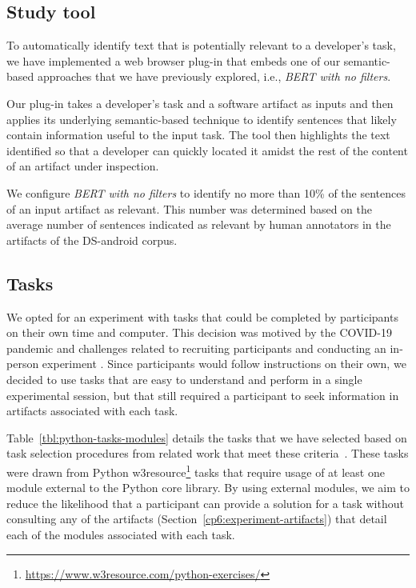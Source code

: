\subsection{Study tool}



To automatically identify text that is potentially relevant to a developer's task, we have implemented 
a web browser plug-in that embeds one of our semantic-based approaches that we have previously explored, i.e., \textit{BERT with no filters}.

 


Our plug-in takes a developer's task and a software artifact as inputs and then applies its underlying semantic-based technique  to identify sentences that likely contain information useful to the input task.
The tool then highlights the text identified so that a developer can quickly located it amidst the rest of the content of an artifact  under inspection. 


We configure \textit{BERT with no filters} to identify no more than 10\% of the sentences of an input artifact as relevant.
This number was determined based on the average number of sentences indicated as relevant by human annotators in the artifacts of the \acs{DS-android} corpus.


\subsection{Tasks}
\label{cp6:tasks}


We opted for an experiment with tasks that could be completed by participants on their own time and computer.
This decision was motived by the COVID-19 pandemic and challenges related to recruiting participants and conducting an in-person experiment . 
Since participants would follow instructions on their own, we decided to use tasks that are easy to understand and perform in a single experimental session, but that still required a participant  
to seek information in artifacts associated with each task.


Table~\ref{tbl:python-tasks-modules} details the tasks that we have selected based on task selection procedures from related work that meet these criteria~\cite{thiselton2019}. 
These tasks were drawn from
Python w3resource\footnote{\url{https://www.w3resource.com/python-exercises/}} tasks
that require usage of at least one module external to the Python core library.
By using external modules, we aim to reduce the likelihood that a participant 
can provide a solution for a task without consulting any of the artifacts (Section~\ref{cp6:experiment-artifacts})
that detail each of the modules associated with each task. 


